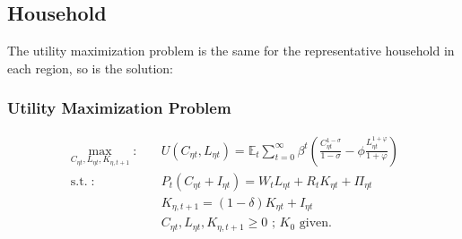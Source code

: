 \documentclass[
	12pt,
	]{article}
\numberwithin{equation}{section}
\DeclareMathOperator{\st}{s.t.}
\newcommand{\E}[1][t]{{\mathbb{E}_{#1}}}
\theoremstyle{definition}
\theoremstyle{plain}
\theoremstyle{plain}
\theoremstyle{plain}
\begin{document}

\subsection{Household}

The utility maximization problem is the same for the representative household in each region, so is the solution:

\subsubsection*{Utility Maximization Problem}

\begin{align}
	\max_{C_{\eta t},L_{\eta t},K_{\eta, t+1}}: \quad & U(C_{\eta t},L_{\eta t}) = \E \sum_{t=0}^{\infty} \beta^t \left(\frac{C_{\eta t}^{1-\sigma}}{1-\sigma} - \phi \frac{L_{\eta t}^{1+\varphi}}{1+\varphi} \right) \label{eq:household-utility-function} \\
	\st: \quad & P_t (C_{\eta t} + I_{\eta t}) = W_t L_{\eta t} + R_t K_{\eta t} + {\Pi}_{\eta t} \label{eq:household-budget-constraint}\\
	\label{eq:law-of-motion-for-capital}
	\quad & K_{\eta, t+1} = (1-\delta)K_{\eta t} + I_{\eta t} \\
	\quad & C_{\eta t},L_{\eta t},K_{\eta, t+1} \geq 0 \text{ ; $K_0$ given.} \nonumber
\end{align}
\end{document}
